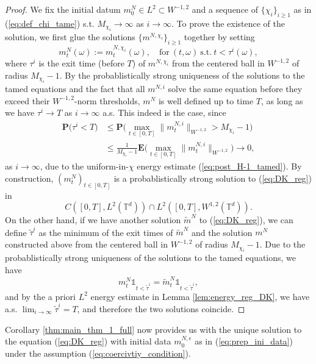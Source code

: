 \begin{proof} We fix the initial datum $m_0^N \in L^2 \subset W^{-1,2}$ and a sequence of $\{\chi_i\}_{i \geq 1}$ as in (\ref{eq:def_chi_tame}) s.t. $M_{\chi_i} \to \infty$ as $i \to \infty$. To prove the existence of the solution, we first glue the solutions $\{m^{N,\chi_i}\}_{i \geq 1}$ together by setting
\begin{equation}
    m^N_t(\omega) := m^{N,\chi_i}_t(\omega), \quad \text{for}\ (t,\omega)  \ \text{s.t.}\ t < \tau^i(\omega),
\end{equation}
where $\tau^i$ is the exit time (before $T$) of $m^{N,\chi_i}$ from the centered ball in $W^{-1,2}$ of radius $M_{\chi_i} -1$. By the probablistically strong uniqueness of the solutions to the tamed equations and the fact that all $m^{N,i}$ solve the same equation before they exceed their $W^{-1,2}$-norm thresholds, $m^N$ is well defined up to time $T$, as long as we have $\tau^i \to T$ as $i \to \infty$ a.s. This indeed is the case, since 
\begin{align*}
    \mathbf{P}\big(\tau^i < T\big) & \leq \mathbf{P}\Big(\max_{t \in [0,T]} \|m_t^{N,i}\|_{W^{-1,2}} > M_{\chi_i} -1 \Big)\\
    & \leq \frac{1}{M_{\chi_i}-1}\mathbf{E}\Big(\max_{t \in [0,T]} \|m_t^{N,i}\|_{W^{-1,2}}  \Big) \to 0,
\end{align*}
as $i \to \infty$, due to the uniform-in-$\chi$ energy estimate (\ref{eq:post_H-1_tamed}). By construction, $(m_t^N)_{t \in [0,T]}$ is a probablistically strong solution to (\ref{eq:DK_reg}) in 
\[
C([0,T], L^2(\mathbb{T}^d)) \cap L^2([0,T], W^{1,2}(\mathbb{T}^d)).
\]
On the other hand, if we have another solution $\tilde{m}^{N}$ to (\ref{eq:DK_reg}), we can define $\tilde{\tau}^i$ as the minimum of the exit times of $\tilde{m}^{N}$ and the solution $m^{N}$ constructed above from the centered ball in $W^{-1,2}$ of radius $M_{\chi_i} -1$. Due to the probablistically strong uniqueness of the solutions to the tamed equations, we have
\[
m^N_t\mathds{1}_{t < \tilde{\tau}^i} = \tilde{m}^N_t\mathds{1}_{t < \tilde{\tau}^i},
\]
and by the a priori $L^2$ energy estimate in Lemma \ref{lem:energy_reg_DK}, we have a.s. $\lim_{i \to \infty} \tilde{\tau}^{i} = T$, and therefore the two solutions coincide.
\end{proof}

Corollary \ref{thm:main_thm_1_full} now provides us with the unique solution to the equation (\ref{eq:DK_reg}) with initial data $m_0^{N,\epsilon}$ as in (\ref{eq:prep_ini_data}) under the assumption (\ref{eq:coercivtiy_condition}). 


